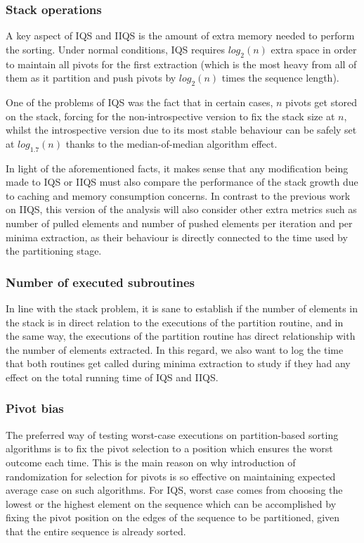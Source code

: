 \subsubsection{Stack operations}
A key aspect of IQS and IIQS is the amount of extra memory needed to perform the sorting. Under normal conditions, IQS requires $log_2(n)$ extra space in order to maintain all pivots for the first extraction (which is the most heavy from all of them as it partition and push pivots by $log_2(n)$ times the sequence length).

One of the problems of IQS was the fact that in certain cases, $n$ pivots get stored on the stack, forcing for the non-introspective version to fix the stack size at $n$, whilst the introspective version due to its most stable behaviour can be safely set at $log_{1.7}(n)$ thanks to the median-of-median algorithm effect.

In light of the aforementioned facts, it makes sense that any modification being made to IQS or IIQS must also compare the performance of the stack growth due to caching and memory consumption concerns. In contrast to the previous work on IIQS, this version of the analysis will also consider other extra metrics such as number of pulled elements and number of pushed elements per iteration and per minima extraction, as their behaviour is directly connected to the time used by the partitioning stage.

\subsubsection{Number of executed subroutines}
In line with the stack problem, it is sane to establish if the number of elements in the stack is in direct relation to the executions of the partition routine, and in the same way, the executions of the partition routine has direct relationship with the number of elements extracted. In this regard, we also want to log the time that both routines get called during minima extraction to study if they had any effect on the total running time of IQS and IIQS.

\subsubsection{Pivot bias}
The preferred way of testing worst-case executions on partition-based sorting algorithms is to fix the pivot selection to a position which ensures the worst outcome each time. This is the main reason on why introduction of randomization for selection for pivots is so effective on maintaining expected average case on such algorithms. For IQS, worst case comes from choosing the lowest or the highest element on the sequence which can be accomplished by fixing the pivot position on the edges of the sequence to be partitioned, given that the entire sequence is already sorted.

